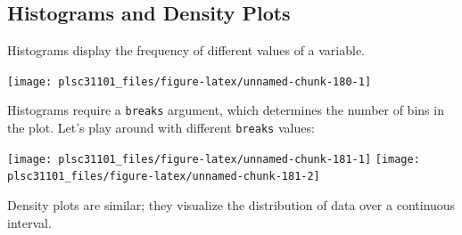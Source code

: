 \documentclass[
]{book}
\newenvironment{Shaded}{\begin{snugshade}}{\end{snugshade}}
\newcommand{\AlertTok}[1]{\textcolor[rgb]{0.94,0.16,0.16}{#1}}
\newcommand{\CommentTok}[1]{\textcolor[rgb]{0.56,0.35,0.01}{\textit{#1}}}
\newcommand{\DataTypeTok}[1]{\textcolor[rgb]{0.13,0.29,0.53}{#1}}
\newcommand{\DecValTok}[1]{\textcolor[rgb]{0.00,0.00,0.81}{#1}}
\newcommand{\KeywordTok}[1]{\textcolor[rgb]{0.13,0.29,0.53}{\textbf{#1}}}
\newcommand{\NormalTok}[1]{#1}
\newcommand{\OperatorTok}[1]{\textcolor[rgb]{0.81,0.36,0.00}{\textbf{#1}}}
\newcommand{\StringTok}[1]{\textcolor[rgb]{0.31,0.60,0.02}{#1}}
\begin{document}
\hypertarget{histograms-and-density-plots}{%
\subsection{Histograms and Density Plots}\label{histograms-and-density-plots}}

Histograms display the frequency of different values of a variable.

\begin{Shaded}
\end{Shaded}

\begin{center}\texttt{[image: plsc31101\_files/figure-latex/unnamed-chunk-180-1]} \end{center}

Histograms require a \texttt{breaks} argument, which determines the number of bins in the plot. Let's play around with different \texttt{breaks} values:

\begin{Shaded}
\end{Shaded}

\begin{center}\texttt{[image: plsc31101\_files/figure-latex/unnamed-chunk-181-1]} \texttt{[image: plsc31101\_files/figure-latex/unnamed-chunk-181-2]} \end{center}

Density plots are similar; they visualize the distribution of data over a continuous interval.

\begin{Shaded}
\end{Shaded}
\end{document}
